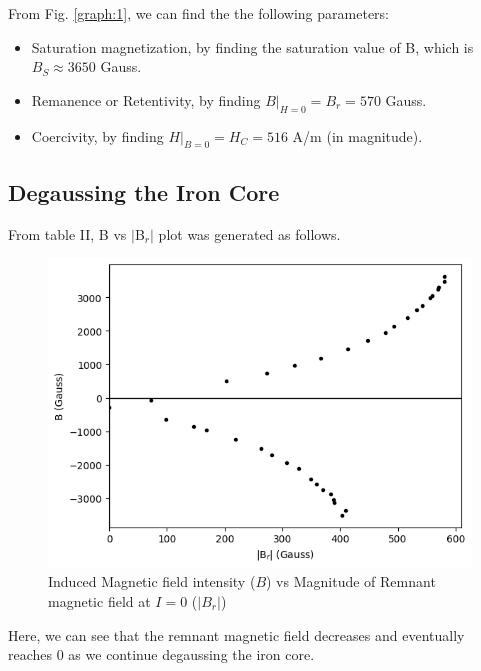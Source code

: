 From Fig. \ref{graph:1}, we can find the the following parameters:

\begin{itemize}
    \item Saturation magnetization, by finding the saturation value of B, which is $B_S \approx 3650$ Gauss.
    \item Remanence or Retentivity, by finding $B|_{H=0} = B_r = 570$ Gauss.
    \item Coercivity, by finding $H|_{B=0} = H_C = 516$ A/m (in magnitude).
\end{itemize} 

\subsection*{Degaussing the Iron Core}
From table II, B vs $|$B$_r|$ plot was generated as follows.

\begin{figure}[H]
    \centering
    \includegraphics[width=1\columnwidth]{images/g2.png}
    \caption{Induced Magnetic field intensity ($B$) vs Magnitude of Remnant magnetic field at $I=0$ ($|B_r|$)}
    \label{graph:2}
\end{figure}

Here, we can see that the remnant magnetic field decreases and eventually reaches 0 as we continue degaussing the iron core.